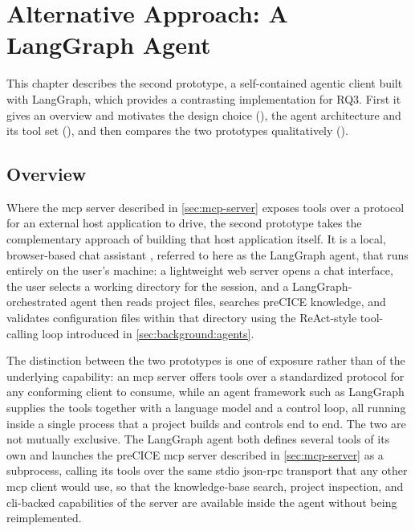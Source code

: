 \documentclass[
  numbers=noenddot,
  english,
  a4paper,
  twoside,
  bibliography=totoc,
  headsepline,
  cleardoublepage=empty,
  parskip=half,
  draft=false
]{scrbook}
\theoremstyle{break}
\renewcommand{\_}{\textunderscore\allowbreak}
\begin{document}
\chapter{Alternative Approach: A LangGraph Agent}\label{sec:claudecode-approach}

This chapter describes the second prototype, a self-contained agentic client built with
LangGraph, which provides a contrasting implementation for RQ3. First it  gives an overview and 
motivates the design choice (), the agent architecture and 
its tool set (), and then compares the two prototypes 
qualitatively ().


\section{Overview}\label{sec:claudecode-approach:overview}

Where the \gls{mcp} server described in \cref{sec:mcp-server} exposes tools over a protocol for
an external host application to drive, the second prototype takes the complementary approach of
building that host application itself.
It is a local, browser-based chat assistant \cite{dange2026preciceailang}, referred to here as
the LangGraph agent, that runs entirely on the user's machine: a lightweight web server opens a
chat interface, the user selects a working directory for the session, and a
LangGraph-orchestrated agent then reads project files, searches preCICE knowledge, and
validates configuration files within that
directory using the ReAct-style tool-calling loop introduced in
\cref{sec:background:agents}.

The distinction between the two prototypes is one of exposure rather than of the underlying
capability: an \gls{mcp} server offers tools over a standardized protocol for any conforming
client to consume, while an agent framework such as LangGraph supplies the tools together with
a language model and a control loop, all running inside a single process that a project builds
and controls end to end.
The two are not mutually exclusive.
The LangGraph agent both defines several tools of its own and launches the preCICE \gls{mcp}
server described in \cref{sec:mcp-server} as a subprocess, calling its tools over the same
stdio \gls{json}-\gls{rpc} transport that any other \gls{mcp} client would use, so that the
knowledge-base search, project inspection, and \gls{cli}-backed capabilities of the server are
available inside the agent without being reimplemented.
\end{document}
